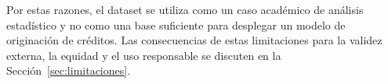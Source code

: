 Por estas razones, el dataset se utiliza como un caso académico de
análisis estadístico y no como una base suficiente para desplegar un
modelo de originación de créditos. Las consecuencias de estas
limitaciones para la validez externa, la equidad y el uso responsable se
discuten en la Sección~\ref{sec:limitaciones}.

